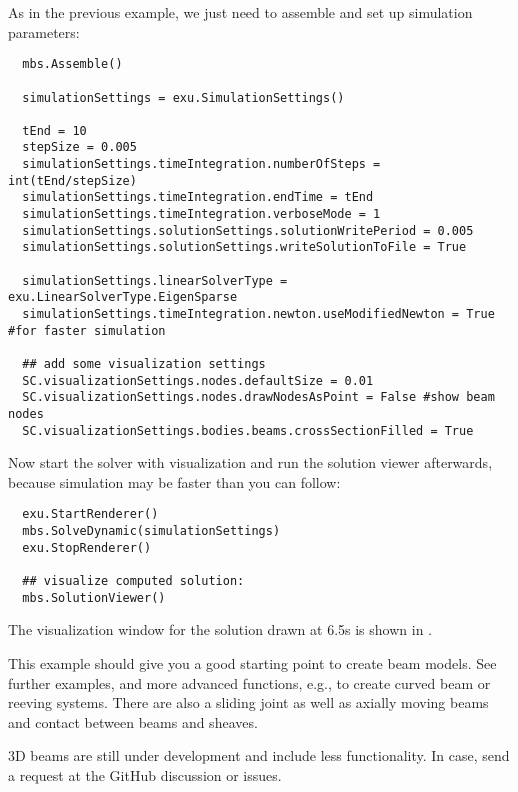\noindent As in the previous example, we just need to assemble and set up simulation parameters:
\pythonstyle\begin{lstlisting}
  mbs.Assemble()

  simulationSettings = exu.SimulationSettings()
      
  tEnd = 10
  stepSize = 0.005
  simulationSettings.timeIntegration.numberOfSteps = int(tEnd/stepSize)
  simulationSettings.timeIntegration.endTime = tEnd
  simulationSettings.timeIntegration.verboseMode = 1
  simulationSettings.solutionSettings.solutionWritePeriod = 0.005
  simulationSettings.solutionSettings.writeSolutionToFile = True

  simulationSettings.linearSolverType = exu.LinearSolverType.EigenSparse
  simulationSettings.timeIntegration.newton.useModifiedNewton = True #for faster simulation

  ## add some visualization settings
  SC.visualizationSettings.nodes.defaultSize = 0.01
  SC.visualizationSettings.nodes.drawNodesAsPoint = False #show beam nodes
  SC.visualizationSettings.bodies.beams.crossSectionFilled = True
\end{lstlisting}

\noindent Now start the solver with visualization and run the solution viewer afterwards,
because simulation may be faster than you can follow:
\pythonstyle\begin{lstlisting}
  exu.StartRenderer()
  mbs.SolveDynamic(simulationSettings)
  exu.StopRenderer()

  ## visualize computed solution:
  mbs.SolutionViewer()
\end{lstlisting}

\noindent The visualization window for the solution drawn at 6.5s is shown in .
%
%

\noindent This example should give you a good starting point to create beam models.
See further examples, and more advanced functions, e.g., to create curved beam or reeving systems.
There are also a sliding joint as well as axially moving beams and contact between beams and sheaves.

\noindent 3D beams are still under development and include less functionality. In case, send a request at the GitHub discussion or issues.

